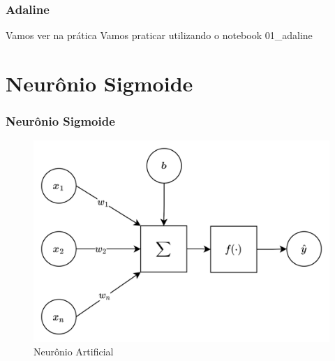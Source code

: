 \documentclass{beamer}
\begin{document}
\begin{frame}
	\frametitle{Adaline}
	\begin{block}{Vamos ver na prática}
		Vamos praticar utilizando o notebook 01\_adaline
	\end{block}
\end{frame}


\section{Neurônio Sigmoide}


\begin{frame}
	\frametitle{Neurônio Sigmoide}
	\begin{figure}
		\centering
		\includegraphics[width=0.4\linewidth]{figures/neuron_ai}
		\caption{Neurônio Artificial}
		\label{fig:neuronai_sig}
	\end{figure}
\end{frame}
\end{document}
